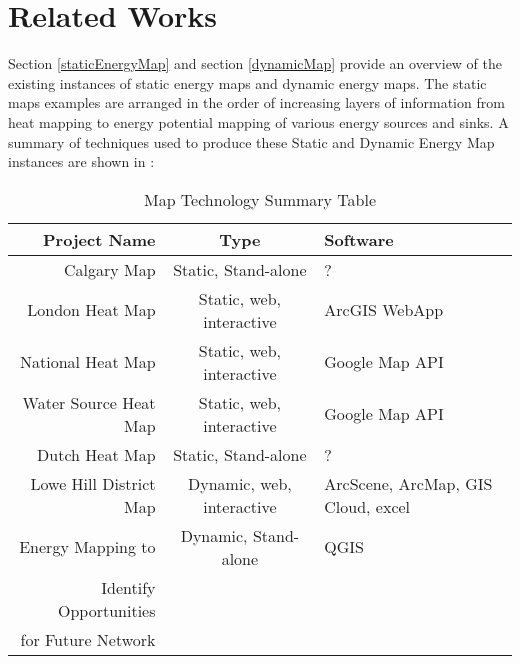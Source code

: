 
\chapter{Related Works} %

\label{Chapter2} %



Section \ref{staticEnergyMap} and section \ref{dynamicMap} provide an
overview of the existing instances of static energy maps and dynamic
energy maps. The static maps examples are arranged in the order of
increasing layers of information from heat mapping to energy potential
mapping of various energy sources and sinks. A summary of techniques
used to produce these Static and Dynamic Energy Map instances are
shown in :

\begin{comment}
Section \ref{mapDesign} and \ref{stDataAnalysis} provides
some supporting evidences for certain design choices. Section
\ref{4dMap} provides some information on potential technologies for
further development. \grey{(?? are not written)}
\end{comment}

\begin{table}[h!]
  \centering
  \begin{tabular}{r|c|p{4cm}}
    \hline
Project Name           &Type   & Software \\
    \hline
    \hline
Calgary Map            &Static, Stand-alone &     ?    \\
    \hline
London Heat Map        &Static, web, interactive &ArcGIS WebApp\\
    \hline
National Heat Map      &Static, web, interactive &Google Map API \\
    \hline
Water Source Heat Map  &Static, web, interactive &Google Map API \\
    \hline
Dutch Heat Map         &Static, Stand-alone&     ?    \\
    \hline
Lowe Hill District Map &Dynamic, web, interactive&ArcScene, ArcMap,
                                                   GIS Cloud, excel  \\
    \hline
Energy Mapping to      &Dynamic, Stand-alone&QGIS      \\
Identify Opportunities & &          \\
for Future Network     & &          \\
    \hline
  \end{tabular}
  \caption{Map Technology Summary Table}
  \label{tab:mapSummary}
\end{table}

